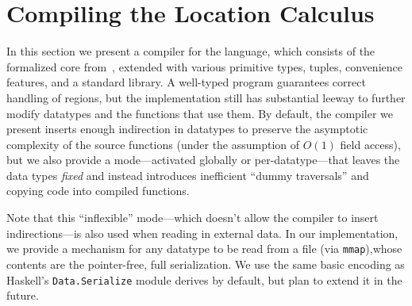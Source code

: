 \documentclass[showabstract,showacknowledgments,showpreface,showdedication]{iuphd}
\theoremstyle{nonumberplain}
\newcommand{\il}[1]{\lstinline[style=inline,mathescape=true];#1;}
\begin{document}


\section{Compiling the Location Calculus} \label{sec:impl-local}

In this section we present a compiler for the \ourcalc language, which consists of
the formalized core from~, extended with various primitive types, tuples,
convenience features, and a standard library.
%
A well-typed \ourcalc program guarantees correct handling of regions, but the
implementation still has substantial leeway to further modify datatypes and 
the functions that use them.
%
By default, the compiler we present inserts enough indirection in
datatypes to preserve the asymptotic complexity of the source functions (under
the assumption of $O(1)$ field access), but we also provide a mode---activated
globally or per-datatype---that leaves the data types
\emph{fixed} and instead introduces inefficient ``dummy traversals'' and copying
code into compiled functions.
%
%

{Note that this ``inflexible'' mode---which doesn't allow the compiler to
  insert indirections---is also used when reading in external data.  In our
  \ourcalc implementation, we provide a mechanism for any datatype to be read
  from a file (via \il{mmap}),whose contents are the pointer-free, full
  serialization.  We use the same basic encoding as Haskell's
  \il{Data.Serialize} module derives by default, but plan to extend it in the
  future.}
\end{document}
